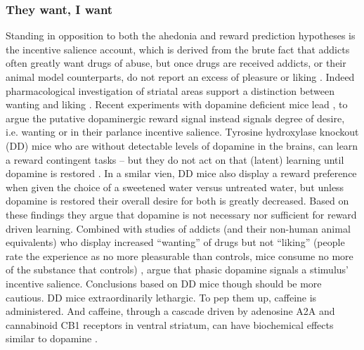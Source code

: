 \documentclass[doc,12pt]{apa}        %
\begin{document}
\subsubsection{They want, I want}
\label{subsub:salience}
Standing in opposition to both the ahedonia and reward prediction hypotheses is the incentive salience account, which is derived from the brute fact that addicts often greatly want drugs of abuse, but once drugs are received addicts, or their animal model counterparts, do not report an excess of pleasure or liking \cite{Robinson:1993p8987}.  Indeed pharmacological investigation of striatal areas support a distinction between wanting and liking \cite{Berridge:2003p8998}.  Recent experiments with dopamine deficient mice lead , to argue the putative dopaminergic reward signal instead signals degree of desire, i.e. wanting or in their parlance incentive salience.  Tyrosine hydroxylase knockout (DD) mice who are without detectable levels of dopamine in the brains, can learn a reward contingent tasks -- but they do not act on that (latent) learning until dopamine is restored \cite{Berridge:2007p7235}. In a smilar vien, DD mice also display a reward preference when given the choice of a sweetened water versus untreated water, but unless dopamine is restored their overall desire for both is greatly decreased.  Based on these findings they argue that dopamine is not necessary nor sufficient for reward driven learning.  Combined with studies of addicts (and their non-human animal equivalents) who display increased ``wanting'' of drugs but not ``liking'' (people rate the experience as no more pleasurable than controls, mice consume no more of the substance that controls) , argue that phasic dopamine signals a stimulus' incentive salience.  Conclusions based on DD mice though should be more cautious.  DD mice extraordinarily lethargic.  To pep them up, caffeine is administered.  And caffeine, through a cascade driven by adenosine A2A and cannabinoid CB1 receptors in ventral striatum, can have biochemical effects similar to dopamine \cite{Lazarus:2011p8137, Rossi:2010p7252}.
\end{document}
